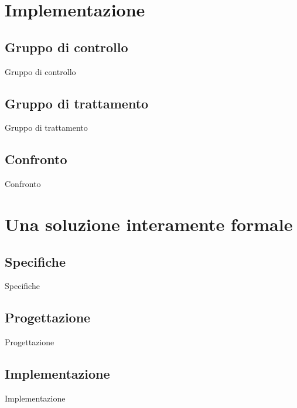 \documentclass{beamer}
\begin{document}
\section{Implementazione}

\subsection{Gruppo di controllo}
\begin{frame}{Gruppo di controllo}

\end{frame}

\subsection{Gruppo di trattamento}
\begin{frame}{Gruppo di trattamento}

\end{frame}

\subsection{Confronto}
\begin{frame}{Confronto}

\end{frame}

\section{Una soluzione interamente formale}

\subsection{Specifiche}
\begin{frame}{Specifiche}

\end{frame}

\subsection{Progettazione}
\begin{frame}{Progettazione}

\end{frame}

\subsection{Implementazione}
\begin{frame}{Implementazione}

\end{frame}
\end{document}
